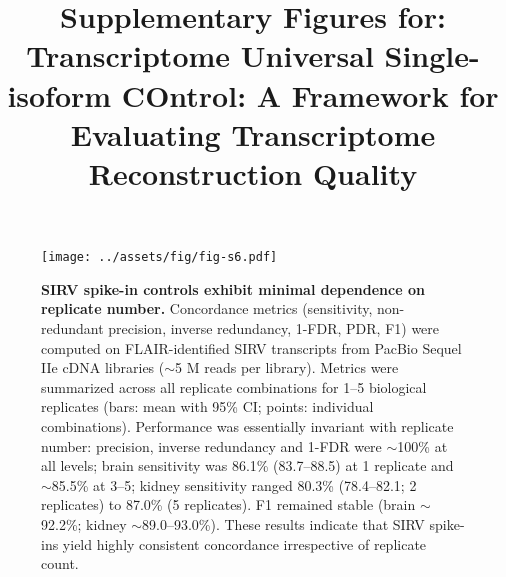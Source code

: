 {  \begin{figure}[htbp]
      \centering
      \texttt{[image: ../assets/fig/fig-s6.pdf]}
      \caption{\textbf{SIRV spike-in controls exhibit minimal dependence on replicate number.} Concordance metrics (sensitivity, non-redundant precision, inverse redundancy, 1-FDR, PDR, F1) were computed on FLAIR-identified SIRV transcripts from PacBio Sequel IIe cDNA libraries ($\sim$5 M reads per library). Metrics were summarized across all replicate combinations for 1--5 biological replicates (bars: mean with 95\% CI; points: individual combinations). Performance was essentially invariant with replicate number: precision, inverse redundancy and 1-FDR were $\sim$100\% at all levels; brain sensitivity was 86.1\% (83.7--88.5) at 1 replicate and $\sim$85.5\% at 3--5; kidney sensitivity ranged 80.3\% (78.4--82.1; 2 replicates) to 87.0\% (5 replicates). F1 remained stable (brain $\sim$92.2\%; kidney $\sim$89.0--93.0\%). These results indicate that SIRV spike-ins yield highly consistent concordance irrespective of replicate count.}
      \label{fig:s6}
  \end{figure}
}

\ifdefined\SupplementMaster
  \SupplementFiguresContent
\else

\documentclass[pdflatex,sn-nature]{sn-jnl}%

\usepackage{graphicx}
\usepackage{multirow}
\usepackage{amsmath,amssymb,amsfonts}
\usepackage{amsthm}
\usepackage{mathrsfs}
\usepackage[title]{appendix}
\usepackage{xcolor}
\usepackage{textcomp}
\usepackage{manyfoot}
\usepackage{booktabs}
\usepackage{hyperref}
\usepackage{cleveref}

\raggedbottom



\title{Supplementary Figures for:\\
Transcriptome Universal Single-isoform COntrol: A Framework for Evaluating Transcriptome Reconstruction Quality}

\author[1]{ }
\author[1]{ }
\author[2]{ }
\author[1,3]{ }
\author[4]{ }
\author*[1]{ }


\maketitle

\clearpage

\SupplementFiguresContent


\fi
